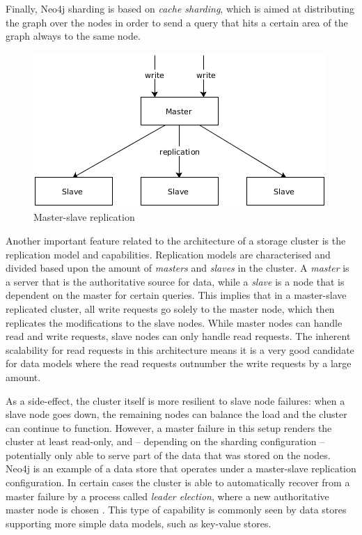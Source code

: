 Finally, Neo4j sharding is based on \textit{cache sharding}, which is aimed at distributing the graph over the nodes in order to send a query that hits a certain area of the graph always to the same node.

\begin{figure}
  \centering
  \includegraphics[width=.6\textwidth]{img/replication-master-slave.png}
  \caption{Master-slave replication}
  \label{fig:replication-master-slave}
\end{figure}

Another important feature related to the architecture of a storage cluster is the replication model and capabilities.
Replication models are characterised and divided based upon the amount of \textit{masters} and \textit{slaves} in the cluster.
A \textit{master} is a server that is the authoritative source for data, while a \textit{slave} is a node that is dependent on the master for certain queries.
This implies that in a master-slave replicated cluster, all write requests go solely to the master node, which then replicates the modifications to the slave nodes.
While master nodes can handle read and write requests, slave nodes can only handle read requests.
The inherent scalability for read requests in this architecture means it is a very good candidate for data models where the read requests outnumber the write requests by a large amount.

As a side-effect, the cluster itself is more resilient to slave node failures: when a slave node goes down, the remaining nodes can balance the load and the cluster can continue to function.
However, a master failure in this setup renders the cluster at least read-only, and -- depending on the sharding configuration -- potentially only able to serve part of the data that was stored on the nodes.
Neo4j is an example of a data store that operates under a master-slave replication configuration.
In certain cases the cluster is able to automatically recover from a master failure by a process called \textit{leader election}, where a new authoritative master node is chosen \autocite{Sing1996}.
This type of capability is commonly seen by data stores supporting more simple data models, such as key-value stores.

